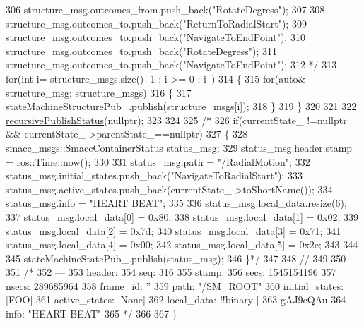 \begin{DoxyCode}
306 \textcolor{comment}{    structure\_msg.outcomes\_from.push\_back("RotateDegress");}
307 \textcolor{comment}{}
308 \textcolor{comment}{    structure\_msg.outcomes\_to.push\_back("ReturnToRadialStart");}
309 \textcolor{comment}{    structure\_msg.outcomes\_to.push\_back("NavigateToEndPoint");}
310 \textcolor{comment}{    structure\_msg.outcomes\_to.push\_back("RotateDegress");}
311 \textcolor{comment}{    structure\_msg.outcomes\_to.push\_back("NavigateToEndPoint");}
312 \textcolor{comment}{*/}
313     \textcolor{keywordflow}{for}(\textcolor{keywordtype}{int} i= structure\_msgs.size() -1 ; i >= 0 ; i--)
314     \{
315         \textcolor{keywordflow}{for}(\textcolor{keyword}{auto}& structure\_msg: structure\_msgs)
316         \{
317             \hyperlink{structsmacc_1_1SmaccStateMachineBase_af586b32d0f79caba26c2dbca76a55767}{stateMachineStructurePub\_}.publish(structure\_msgs[i]);
318         \}
319     \}
320 
321     
322     \hyperlink{structsmacc_1_1SmaccStateMachineBase_a5c078ef0eec2c64ecd9a31b46341b13c}{recursivePublishStatus}(\textcolor{keyword}{nullptr});
323     
324 
325     \textcolor{comment}{/*    }
326 \textcolor{comment}{    if(currentState\_ !=nullptr && currentState\_->parentState\_==nullptr)}
327 \textcolor{comment}{    \{        }
328 \textcolor{comment}{        smacc\_msgs::SmaccContainerStatus status\_msg;}
329 \textcolor{comment}{        status\_msg.header.stamp = ros::Time::now();}
330 \textcolor{comment}{}
331 \textcolor{comment}{        status\_msg.path = "/RadialMotion";}
332 \textcolor{comment}{        status\_msg.initial\_states.push\_back("NavigateToRadialStart");}
333 \textcolor{comment}{        status\_msg.active\_states.push\_back(currentState\_->toShortName());}
334 \textcolor{comment}{        status\_msg.info = "HEART BEAT";}
335 \textcolor{comment}{        }
336 \textcolor{comment}{        status\_msg.local\_data.resize(6);}
337 \textcolor{comment}{        status\_msg.local\_data[0] = 0x80;}
338 \textcolor{comment}{        status\_msg.local\_data[1] = 0x02;}
339 \textcolor{comment}{        status\_msg.local\_data[2] = 0x7d;}
340 \textcolor{comment}{        status\_msg.local\_data[3] =  0x71;}
341 \textcolor{comment}{        status\_msg.local\_data[4] = 0x00;}
342 \textcolor{comment}{        status\_msg.local\_data[5] = 0x2e;}
343 \textcolor{comment}{}
344 \textcolor{comment}{}
345 \textcolor{comment}{        stateMachineStatePub\_.publish(status\_msg);}
346 \textcolor{comment}{    \}*/}
347 
348 \textcolor{comment}{//}
349 
350 
351     \textcolor{comment}{/*}
352 \textcolor{comment}{    ---}
353 \textcolor{comment}{    header: }
354 \textcolor{comment}{    seq: 316}
355 \textcolor{comment}{    stamp: }
356 \textcolor{comment}{        secs: 1545154196}
357 \textcolor{comment}{        nsecs: 289685964}
358 \textcolor{comment}{    frame\_id: ''}
359 \textcolor{comment}{    path: "/SM\_ROOT"}
360 \textcolor{comment}{    initial\_states: [FOO]}
361 \textcolor{comment}{    active\_states: [None]}
362 \textcolor{comment}{    local\_data: !!binary |}
363 \textcolor{comment}{    gAJ9cQAu}
364 \textcolor{comment}{    info: "HEART BEAT"}
365 \textcolor{comment}{    */}
366     
367 \}      
\end{DoxyCode}
